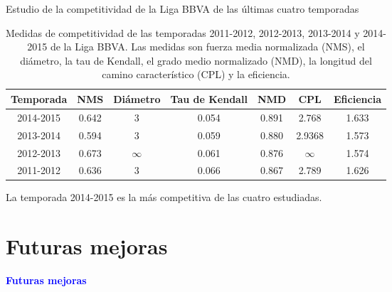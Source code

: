 \documentclass[10pt]{beamer}
\begin{document}
	\begin{frame}{Estudio de la competitividad de la Liga BBVA de las últimas cuatro temporadas}	

		\begin{table}[h]
			\centering
			\caption[Medidas de competitividad de las últimas cuatro temporadas]{Medidas de competitividad de las temporadas 2011-2012, 2012-2013, 2013-2014 y 2014-2015 de la Liga BBVA. Las medidas son fuerza media normalizada (NMS), el diámetro, la tau de Kendall, el grado medio normalizado (NMD), la longitud del camino característico (CPL) y la eficiencia.}
			\label{tbl:medidas}
			\begin{adjustbox}{max width=\textwidth}
			\begin{tabular}{@{}ccccccc@{}}
				\toprule
				Temporada & NMS & Diámetro & Tau de Kendall & NMD & CPL & Eficiencia \\ \midrule
				2014-2015 & 0.642                    & 3        & 0.054          & 0.891                   & 2.768                              & 1.633      \\
				2013-2014 & 0.594                    & 3        & 0.059          & 0.880                   & 2.9368                             & 1.573      \\
				2012-2013 & 0.673                    & $\infty$ & 0.061          & 0.876                   & $\infty$                           & 1.574      \\
				2011-2012 & 0.636                    & 3        & 0.066          & 0.867                   & 2.789                              & 1.626      \\ \bottomrule
			\end{tabular}
			\end{adjustbox}
		\end{table}
		
		La temporada 2014-2015 es la más competitiva de las cuatro estudiadas.
		
	\end{frame}
	
	\section{Futuras mejoras}
	
	\begin{frame}
		\begin{center}
			\Huge\textbf{\textsf{\textcolor{blue}{Futuras mejoras}}}
		\end{center}
	\end{frame}	
	
\end{document}
